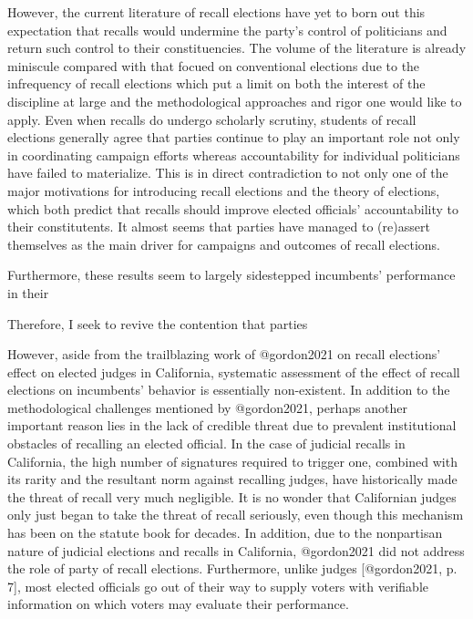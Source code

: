 \documentclass[crop=false]{standalone}
\begin{document}
	However, the current literature of recall elections have yet to born out this expectation that recalls would undermine the party's control of politicians and return such control to their constituencies. The volume of the literature is already miniscule compared with that focued on conventional elections due to the infrequency of recall elections which put a limit on both the interest of the discipline at large and the methodological approaches and rigor one would like to apply. Even when recalls do undergo scholarly scrutiny, students of recall elections generally agree that parties continue to play an important role not only in coordinating campaign efforts whereas accountability for individual politicians have failed to materialize. This is in direct contradiction to not only one of the major motivations for introducing recall elections and the theory of elections, which both predict that recalls should improve elected officials' accountability to their constitutents.
	It almost seems that parties have managed to (re)assert themselves as the main driver for campaigns and outcomes of recall elections.
	
	Furthermore, these results seem to largely sidestepped incumbents' performance in their
	
	Therefore, I seek to revive the contention that parties 
	
	However, aside from the trailblazing work of @gordon2021 on recall elections' effect on elected judges in California, systematic assessment of the effect of recall elections on incumbents' behavior is essentially non-existent. In addition to the methodological challenges mentioned by @gordon2021, perhaps another important reason lies in the lack of credible threat due to prevalent institutional obstacles of recalling an elected official. In the case of judicial recalls in California, the high number of signatures required to trigger one, combined with its rarity and the resultant norm against recalling judges, have historically made the threat of recall very much negligible. It is no wonder that Californian judges only just began to take the threat of recall seriously, even though this mechanism has been on the statute book for decades. In addition, due to the nonpartisan nature of judicial elections and recalls in California, @gordon2021 did not address the role of party of recall elections. Furthermore, unlike judges [@gordon2021, p. 7], most elected officials go out of their way to supply voters with verifiable information on which voters may evaluate their performance.
	
\end{document}
